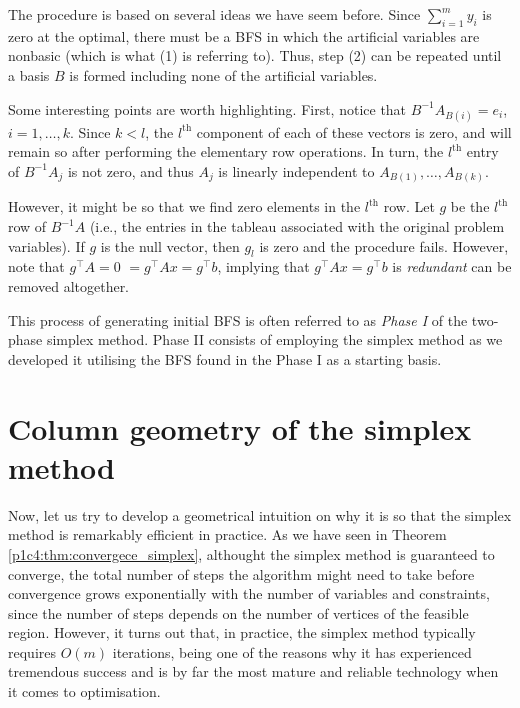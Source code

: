 The procedure is based on several ideas we have seem before. Since $\sum_{i=1}^m y_i$ is zero at the optimal, there must be a BFS in which the artificial variables are nonbasic (which is what (1) is referring to). Thus, step (2) can be repeated until a basis $B$ is formed including none of the artificial variables. 

Some interesting points are worth highlighting. First, notice that $B^{-1}A_{B(i)} = e_i$, $i=1, \dots, k$. Since $k < l$, the $l^{\text{th}}$ component of each of these vectors is zero, and will remain so after performing the elementary row operations. In turn, the $l^{\text{th}}$ entry of $B^{-1}A_j$ is not zero, and thus $A_j$ is linearly independent to $A_{B(1)}, \dots, A_{B(k)}$. 

However, it might be so that we find zero elements in the $l^{\text{th}}$ row. Let $g$ be the $l^{\text{th}}$ row of $B^{-1}A$ (i.e., the entries in the tableau associated with the original problem variables). If $g$ is the null vector, then $g_l$ is zero and the procedure fails. However, note that $g^\top A = 0 $ $= g^\top Ax = g^\top b$, implying that $g^\top Ax = g^\top b$ is \emph{redundant} can be removed altogether. 

This process of generating initial BFS is often referred to as \emph{Phase I} of the two-phase simplex method. Phase II consists of employing the simplex method as we developed it utilising the BFS found in the Phase I as a starting basis.


\section{Column geometry of the simplex method}

Now, let us try to develop a geometrical intuition on why it is so that the simplex method is remarkably efficient in practice. As we have seen in Theorem \ref{p1c4:thm:convergece_simplex}, althought the simplex method is guaranteed to converge, the total number of steps the algorithm might need to take before convergence grows exponentially with the number of variables and constraints, since the number of steps depends on the number of vertices of the feasible region. However, it turns out that, in practice, the simplex method typically requires $O(m)$ iterations, being one of the reasons why it has experienced tremendous success and is by far the most mature and reliable technology when it comes to optimisation. 

